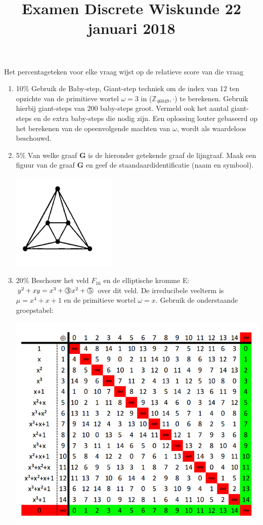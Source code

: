 \documentclass{article}
\def\note#1{\color{cyan} #1 \color{black}}
\def\circled#1{\raisebox{.5pt}{\textcircled{\raisebox{-.9pt} {#1}}}}
\begin{document}
\title{Examen Discrete Wiskunde 22 januari 2018}
\date{}
\author{}
\maketitle

\note{Het percentageteken voor elke vraag wijst op de relatieve score van die vraag}

\begin{enumerate}
\item {\note{10\%} Gebruik de Baby-step, Giant-step techniek om de index van 12 ten opzichte van de primitieve wortel $\omega = 3$ in ($\mathbb{Z}_{46049}, \cdot$) te berekenen. Gebruik hierbij giant-steps van 200 baby-steps groot. Vermeld ook het aantal giant-steps en de extra baby-steps die nodig zijn. Een oplossing louter gebaseerd op het berekenen van de opeenvolgende machten van $\omega$, wordt als waardeloos beschouwd.}
\item {\note{5\%} Van welke graaf {\bf G} is de hieronder getekende graaf de lijngraaf. Maak een figuur van de graaf {\bf G} en geef de staandaardidentificatie (naam en symbool).

    \includegraphics[width=5cm]{lijngraaf}}

\item {\note{20\%} Beschouw het veld $F_{16}$ en de elliptische kromme E: $y^2+xy = x^3 + \circled{3}x^2 + \circled{5} $ over dit veld. De irreducibele veelterm is $\mu = x^4 + x + 1$ en de primitieve wortel $\omega = x$. Gebruik de onderstaande groepstabel: 
\begin{center}
 \includegraphics[width=\linewidth]{groepstabel}
\end{center}


}
\end{enumerate}
\end{document}

